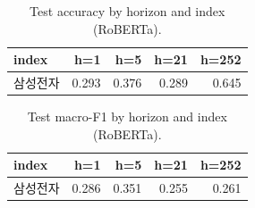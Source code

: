 \begin{table}[t]\centering
\caption{Test accuracy by horizon and index (RoBERTa).}
\begin{tabular}{lrrrr}
\toprule
index & h=1 & h=5 & h=21 & h=252 \\
\midrule
삼성전자 & 0.293 & 0.376 & 0.289 & 0.645 \\
\bottomrule
\end{tabular}
\end{table}

\begin{table}[t]\centering
\caption{Test macro-F1 by horizon and index (RoBERTa).}
\begin{tabular}{lrrrr}
\toprule
index & h=1 & h=5 & h=21 & h=252 \\
\midrule
삼성전자 & 0.286 & 0.351 & 0.255 & 0.261 \\
\bottomrule
\end{tabular}
\end{table}